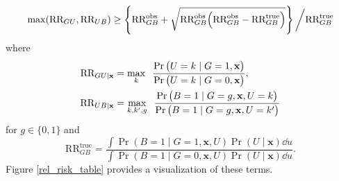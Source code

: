 \documentclass[aoas,preprint, 11pt, dvipsnames, table, x11name]{imsart}
\renewcommand{\bm}[1]{\mathbf{#1}}
\theoremstyle{remark}
\begin{document}
\begin{equation}
	\max(\text{RR}_{GU}, \text{RR}_{UB})\geq \cbr{\text{RR}^{\text{obs}}_{GB}+\sqrt{\text{RR}^{\text{obs}}_{GB}\qty(\text{RR}^{\text{obs}}_{GB}-\text{RR}^{\text{true}}_{GB})}}\bigg{/}\text{RR}^{\text{true}}_{GB}
	\label{high_thresh}
\end{equation}
where
\begin{align*}
	\text{RR}_{GU\mid \bm{x}} &= \max_{k} \;\;  \frac{\Pr\qty(U=k\mid G=1, \bm{x})}{\Pr\qty(U=k\mid G=0, \bm{x})},\\
	\text{RR}_{UB\mid \bm{x}} &= \max_{k,k',g} \;\; \frac{\Pr\qty(B=1\mid G=g, \bm{x}, U=k)}{\Pr\qty(B=1\mid G=g, \bm{x}, U=k')} 
\end{align*}
for $g \in \lbrace 0,1\rbrace$ and
\begin{equation}
	\text{RR}^{\text{true}}_{GB}=\frac{\int \Pr(B=1\mid G=1, \bm{x}, U)\Pr(U\mid \bm{x})\dd u}{\int \Pr(B=1\mid G=0, \bm{x}, U)\Pr(U\mid \bm{x})\dd u}.
	\label{true_causal_rr}
\end{equation} 
Figure \ref{rel_risk_table} provides a visualization of these terms.
\end{document}

